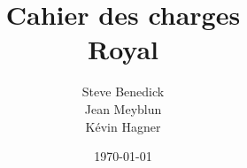 \documentclass[a4paper]{article}
\title{Cahier des charges\\Royal}
\author{Steve Benedick\\Jean Meyblun\\Kévin Hagner}
\date\today
\begin{document}
\maketitle


\newpage{}

\tableofcontents
\newpage{}


\newpage{}


\newpage{}


\newpage{}


\end{document}
